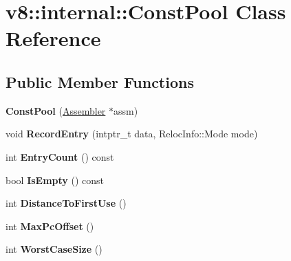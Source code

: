 \hypertarget{classv8_1_1internal_1_1_const_pool}{}\section{v8\+:\+:internal\+:\+:Const\+Pool Class Reference}
\label{classv8_1_1internal_1_1_const_pool}
\subsection*{Public Member Functions}
\begin{DoxyCompactItemize}
\item 
{\bfseries Const\+Pool} (\hyperlink{classv8_1_1internal_1_1_assembler}{Assembler} $\ast$assm)\hypertarget{classv8_1_1internal_1_1_const_pool_a10cd51c71aa865ccd6dec22f830bcfe5}{}\label{classv8_1_1internal_1_1_const_pool_a10cd51c71aa865ccd6dec22f830bcfe5}

\item 
void {\bfseries Record\+Entry} (intptr\+\_\+t data, Reloc\+Info\+::\+Mode mode)\hypertarget{classv8_1_1internal_1_1_const_pool_a6a6bc90a86a47107b5ca98d472ee0862}{}\label{classv8_1_1internal_1_1_const_pool_a6a6bc90a86a47107b5ca98d472ee0862}

\item 
int {\bfseries Entry\+Count} () const \hypertarget{classv8_1_1internal_1_1_const_pool_ade66358ba77b7d2d86ae874475ad6d3e}{}\label{classv8_1_1internal_1_1_const_pool_ade66358ba77b7d2d86ae874475ad6d3e}

\item 
bool {\bfseries Is\+Empty} () const \hypertarget{classv8_1_1internal_1_1_const_pool_a9574a67a23915bad86b4a65c5a2090e6}{}\label{classv8_1_1internal_1_1_const_pool_a9574a67a23915bad86b4a65c5a2090e6}

\item 
int {\bfseries Distance\+To\+First\+Use} ()\hypertarget{classv8_1_1internal_1_1_const_pool_adf9bf9b440686da05462a7b9d734f57f}{}\label{classv8_1_1internal_1_1_const_pool_adf9bf9b440686da05462a7b9d734f57f}

\item 
int {\bfseries Max\+Pc\+Offset} ()\hypertarget{classv8_1_1internal_1_1_const_pool_a194bc8abbe406d30b3c01834dfda7af8}{}\label{classv8_1_1internal_1_1_const_pool_a194bc8abbe406d30b3c01834dfda7af8}

\item 
int {\bfseries Worst\+Case\+Size} ()\hypertarget{classv8_1_1internal_1_1_const_pool_ade9c2b9a5ca36f8b2ff6b9df077187c8}{}\label{classv8_1_1internal_1_1_const_pool_ade9c2b9a5ca36f8b2ff6b9df077187c8}


\end{DoxyCompactItemize}
